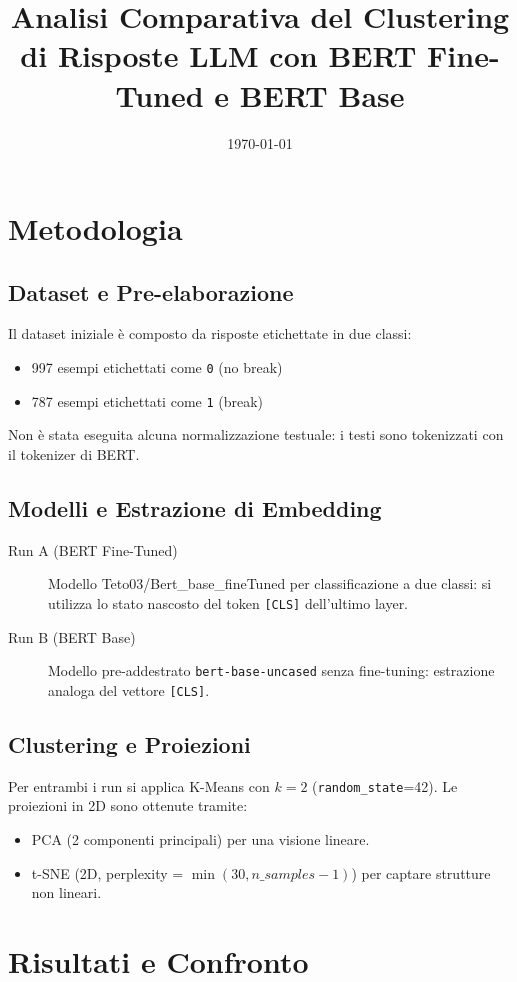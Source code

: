 \documentclass[a4paper,12pt]{article}
\title{Analisi Comparativa del Clustering di Risposte LLM con BERT Fine-Tuned e BERT Base}
\date{\today}
\begin{document}
\maketitle

\section{Metodologia}
\subsection{Dataset e Pre-elaborazione}
Il dataset iniziale è composto da risposte etichettate in due classi:
\begin{itemize}
  \item 997 esempi etichettati come \texttt{0} (no break)
  \item 787 esempi etichettati come \texttt{1} (break)
\end{itemize}
Non è stata eseguita alcuna normalizzazione testuale: i testi sono tokenizzati con il tokenizer di BERT.

\subsection{Modelli e Estrazione di Embedding}
\begin{description}
  \item[Run A (BERT Fine-Tuned)] Modello Teto03/Bert\_base\_fineTuned per classificazione a due classi: si utilizza lo stato nascosto del token \texttt{[CLS]} dell'ultimo layer.
  \item[Run B (BERT Base)] Modello pre-addestrato \texttt{bert-base-uncased} senza fine-tuning: estrazione analoga del vettore \texttt{[CLS]}.
\end{description}

\subsection{Clustering e Proiezioni}
Per entrambi i run si applica K-Means con $k=2$ (\texttt{random\_state}=42). Le proiezioni in 2D sono ottenute tramite:
\begin{itemize}
  \item PCA (2 componenti principali) per una visione lineare.
  \item t-SNE (2D, perplexity = $\min(30, n\_samples-1)$) per captare strutture non lineari.
\end{itemize}

\section{Risultati e Confronto}
\end{document}
